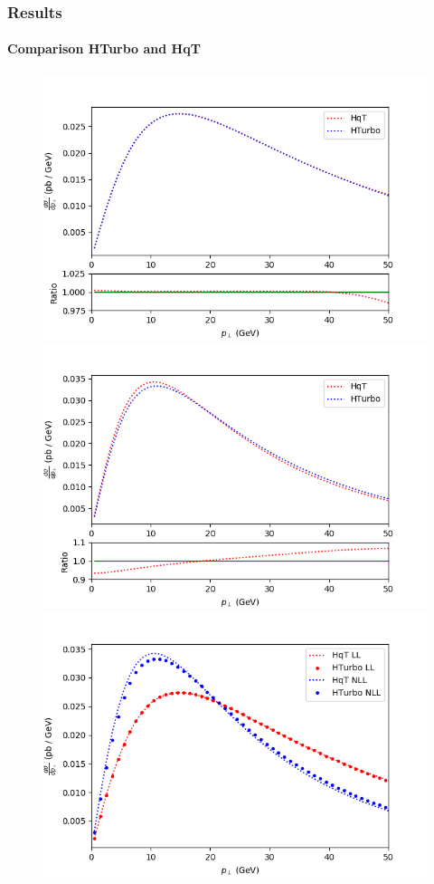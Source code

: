 \documentclass[aspectratio=43]{beamer}
\begin{document}
\begin{frame}

\frametitle{Results}
\framesubtitle{Comparison HTurbo and HqT}

\begin{figure}
	\includegraphics[width = \linewidth]{plots/hturbo_LL.png}
	\endminipage\hfill
	\includegraphics[width = \linewidth]{plots/hturbo_NLL.png}
	\endminipage\hfill
	\includegraphics[width = \linewidth]{plots/hturbo_all.png}
	\endminipage
\end{figure}


\end{frame}
\end{document}
